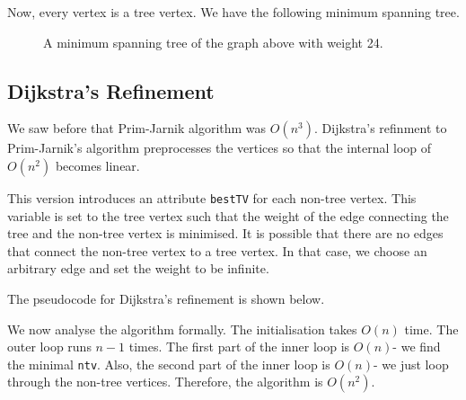 \documentclass[a4paper, openany]{memoir}
\begin{document}
\noindent Now, every vertex is a tree vertex. We have the following minimum spanning tree.
\begin{figure}[H]
    \centering
    \caption{A minimum spanning tree of the graph above with weight 24.}
\end{figure}
\subsection{Dijkstra's Refinement}
We saw before that Prim-Jarnik algorithm was $O(n^3)$. Dijkstra's refinment to Prim-Jarnik's algorithm preprocesses the vertices so that the internal loop of $O(n^2)$ becomes linear.

This version introduces an attribute \texttt{bestTV} for each non-tree vertex. This variable is set to the tree vertex such that the weight of the edge connecting the tree and the non-tree vertex is minimised. It is possible that there are no edges that connect the non-tree vertex to a tree vertex. In that case, we choose an arbitrary edge and set the weight to be infinite.

The pseudocode for Dijkstra's refinement is shown below.


We now analyse the algorithm formally. The initialisation takes $O(n)$ time. The outer loop runs $n-1$ times. The first part of the inner loop is $O(n)$- we find the minimal \texttt{ntv}. Also, the second part of the inner loop is $O(n)$- we just loop through the non-tree vertices. Therefore, the algorithm is $O(n^2)$.
\end{document}
